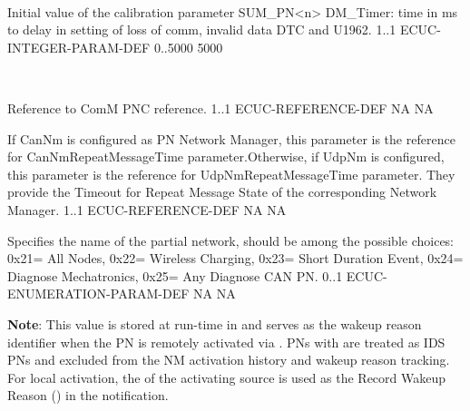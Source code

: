 \\

\medskip


{Initial value of the calibration parameter SUM_PN<n> DM_Timer: time in ms to delay in setting of loss of comm, invalid data DTC and U1962.}
{1..1}
{ECUC-INTEGER-PARAM-DEF}
{0..5000}
{5000}

\\

\medskip

{Reference to ComM PNC reference.}
{1..1}
{ECUC-REFERENCE-DEF}
{NA}
{NA}

\medskip


{If CanNm is configured as PN Network Manager, this parameter is the reference for CanNmRepeatMessageTime parameter.Otherwise, if UdpNm is configured, this parameter is the reference for UdpNmRepeatMessageTime parameter. They provide the Timeout for Repeat Message State of the corresponding Network Manager.}
{1..1}
{ECUC-REFERENCE-DEF}
{NA}
{NA}


{  }


{Specifies the name of the partial network, should be among the possible choices:
                      	0x21= All Nodes,
						0x22= Wireless Charging,
						0x23= Short Duration Event,
						0x24= Diagnose Mechatronics,
						0x25= Any Diagnose CAN PN.}
{0..1}
{ECUC-ENUMERATION-PARAM-DEF}
{NA}
{NA}


\textbf{Note}: This value is stored at run-time in  and serves as the wakeup reason identifier when the PN is remotely activated via . PNs with  are treated as IDS PNs and excluded from the NM activation history and wakeup reason tracking. For local activation, the  of the activating source is used as the Record Wakeup Reason () in the  notification.

{  }